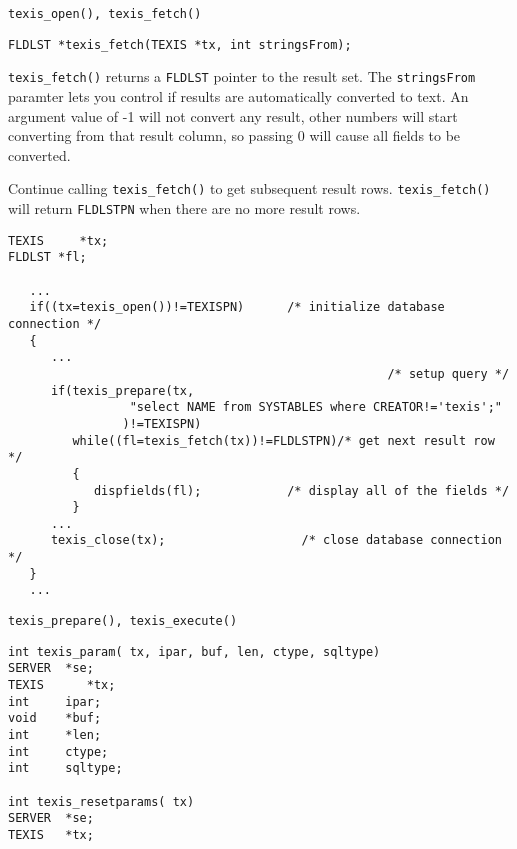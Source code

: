 \SEE
\begin{verbatim}
texis_open(), texis_fetch()
\end{verbatim}


\SYNOPSIS
\begin{verbatim}
FLDLST *texis_fetch(TEXIS *tx, int stringsFrom);
\end{verbatim}

\DESCRIPTION

\verb`texis_fetch()` returns a \verb`FLDLST` pointer to the result
set.  The \verb`stringsFrom` paramter lets you control if results are
automatically converted to text.  An argument value of -1 will not
convert any result, other numbers will start converting from that result
column, so passing 0 will cause all fields to be converted.

Continue calling \verb`texis_fetch()` to get subsequent result rows.
\verb`texis_fetch()` will return \verb`FLDLSTPN` when there are no more
result rows.

\EXAMPLE
\begin{verbatim}
TEXIS     *tx;
FLDLST *fl;

   ...
   if((tx=texis_open())!=TEXISPN)      /* initialize database connection */
   {
      ...
                                                     /* setup query */
      if(texis_prepare(tx,
                 "select NAME from SYSTABLES where CREATOR!='texis';"
                )!=TEXISPN)
         while((fl=texis_fetch(tx))!=FLDLSTPN)/* get next result row */
         {
            dispfields(fl);            /* display all of the fields */
         }
      ...
      texis_close(tx);                   /* close database connection */
   }
   ...
\end{verbatim}

\SEE
\begin{verbatim}
texis_prepare(), texis_execute()
\end{verbatim}


\SYNOPSIS
\begin{verbatim}
int texis_param( tx, ipar, buf, len, ctype, sqltype)
SERVER  *se;
TEXIS      *tx;
int     ipar;
void    *buf;
int     *len;
int     ctype;
int     sqltype;

int texis_resetparams( tx)
SERVER	*se;
TEXIS	*tx;
\end{verbatim}

